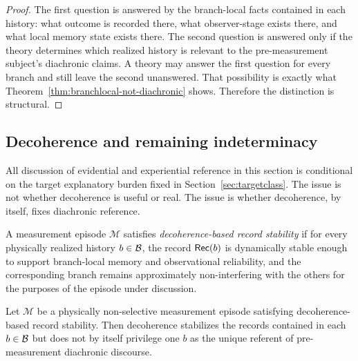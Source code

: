\begin{proof}
The first question is answered by the branch-local facts contained in each history: what outcome is
recorded there, what observer-stage exists there, and what local memory state exists there. The second
question is answered only if the theory determines which realized history is relevant to the
pre-measurement subject's diachronic claims. A theory may answer the first question for every branch
and still leave the second unanswered. That possibility is exactly what
Theorem~\ref{thm:branchlocal-not-diachronic} shows. Therefore the distinction is structural.
\end{proof}

\subsection{Decoherence and remaining indeterminacy}

All discussion of evidential and experiential reference in this section is conditional on the target
explanatory burden fixed in Section~\ref{sec:targetclass}. The issue is not whether decoherence is
useful or real. The issue is whether decoherence, by itself, fixes diachronic reference.

\begin{definition}
A measurement episode $\mathcal{M}$ satisfies \emph{decoherence-based record stability} if for every
physically realized history $b\in\mathcal{B}$, the record $\mathsf{Rec}(b)$ is dynamically stable enough to support
branch-local memory and observational reliability, and the corresponding branch remains
approximately non-interfering with the others for the purposes of the episode under discussion.
\end{definition}

\begin{proposition}
\label{prop:decoherence}
Let $\mathcal{M}$ be a physically non-selective measurement episode satisfying decoherence-based
record stability. Then decoherence stabilizes the records contained in each $b\in\mathcal{B}$ but does not by
itself privilege one $b$ as the unique referent of pre-measurement diachronic discourse.
\end{proposition}

